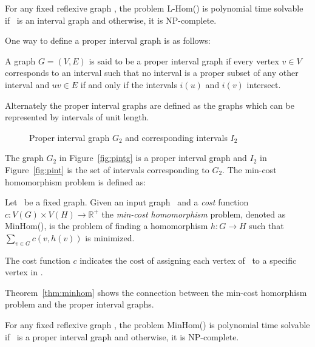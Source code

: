 \begin{theorem}  \label{thm:lhom}
For any fixed reflexive graph \mH, the problem L-Hom(\mH) is polynomial time solvable if
\mH\ is an interval graph and otherwise, it is NP-complete.
\end{theorem}

One way to define a proper interval graph is as follows:

\begin{defi}
A graph \(G=(V,E)\) is said to be a proper interval graph if every vertex \(v \in V\)
corresponds to an interval such that no interval is a proper subset of any other interval
and \(uv \in E\) if and only if the intervals \(i(u)\) and \(i(v)\) intersect.
\end{defi}

Alternately the proper interval graphs are defined as the graphs which can be represented 
by intervals of unit length.

\begin{figure}[h]
\hfill
\subfigure[\ensuremath{G_2}]{\label{fig:pintg}}\hfill 
\subfigure[\ensuremath{I_2}]{\label{fig:pint}}\hfill 
\caption{Proper interval graph \ensuremath{G_2} and corresponding intervals
\ensuremath{I_2}}\label{fig:pintgi}
\end{figure}

The graph \(G_2\) in Figure~\ref{fig:pintg} is a proper interval graph and
\(I_2\) in Figure~\ref{fig:pint} is the set of intervals corresponding to \(G_2\)\@.
The min-cost homomorphism problem is defined as:

\begin{defi} [MinHom]
Let \mH\ be a fixed graph. Given an input graph \mG\ and a \emph{cost} function
\(c: V(G) \times V(H) \to \mathbb{R}^+\) the \emph{min-cost homomorphism} problem,
denoted as MinHom(\mH), is the problem of finding a homomorphism 
\(h:G\to H\) such that \(\sum_{v\in G} c(v, h(v))\) is minimized.
\end{defi}

The cost function \(c\) indicates the cost of assigning each vertex of \mG\ 
to a specific vertex in \mH\@. 

Theorem~\ref{thm:minhom} shows the connection between the min-cost homorphism problem 
and the proper interval graphs.

\begin{theorem} [TODO] \label{thm:minhom}
For any fixed reflexive graph \mH, the problem MinHom(\mH) is polynomial time solvable if
\mH\ is a proper interval graph and otherwise, it is NP-complete.
\end{theorem}

